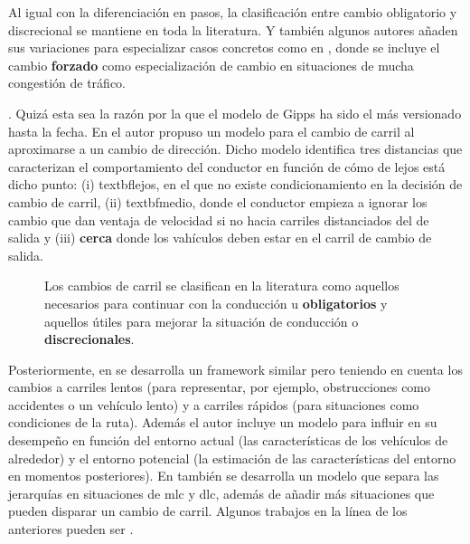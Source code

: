 Al igual con la diferenciación en pasos, la clasificación entre cambio obligatorio y discrecional se mantiene en toda la literatura. Y también algunos autores añaden sus variaciones para especializar casos concretos como en \cite{Ahmed1999}, donde se incluye el cambio \textbf{forzado} como especialización de cambio en situaciones de mucha congestión de tráfico.

. Quizá esta sea la razón por la que el modelo de Gipps ha sido el más versionado hasta la fecha. En \cite{Gipps1986} el autor propuso un modelo para el cambio de carril al aproximarse a un cambio de dirección. Dicho modelo identifica tres distancias que caracterizan el comportamiento del conductor en función de cómo de lejos está dicho punto: (i) textbf{lejos}, en el que no existe condicionamiento en la decisión de cambio de carril, (ii) textbf{medio}, donde el conductor empieza a ignorar los cambio que dan ventaja de velocidad si no hacia carriles distanciados del de salida y (iii) \textbf{cerca} donde los vahículos deben estar en el carril de cambio de salida.

\begin{figure}
	\caption{Los cambios de carril se clasifican en la literatura como aquellos necesarios para continuar con la conducción u \textbf{obligatorios} y aquellos útiles para mejorar la situación de conducción o \textbf{discrecionales}.}
	\label{fig:lane-change-mandatory-vs-discretional}
\end{figure}

Posteriormente, en \cite{wiedemann1992microscopic} se desarrolla un framework similar pero teniendo en cuenta los cambios a carriles lentos (para representar, por ejemplo, obstrucciones como accidentes o un vehículo lento) y a carriles rápidos (para situaciones como condiciones de la ruta). Además el autor incluye un modelo para influir en su desempeño en función del entorno actual (las características de los vehículos de alrededor) y el entorno potencial (la estimación de las características del entorno en momentos posteriores). En \cite{Hidas2002} también se desarrolla un modelo que separa las jerarquías en situaciones de \gls{mlc} y \gls{dlc}, además de añadir más situaciones que pueden disparar un cambio de carril. Algunos trabajos en la línea de los anteriores pueden ser \cite{Yang1996, Halati1997, Ahmed1999}.

